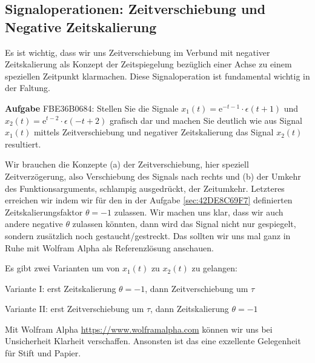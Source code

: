 \subsection{Signaloperationen: Zeitverschiebung und Negative Zeitskalierung}
\label{sec:FBE36B0684}
\begin{Ziel}
Es ist wichtig, dass wir uns Zeitverschiebung im Verbund mit negativer Zeitskalierung
als Konzept der Zeitspiegelung bezüglich einer Achse zu einem speziellen Zeitpunkt
klarmachen. Diese Signaloperation ist fundamental wichtig in der Faltung.
\end{Ziel}
\textbf{Aufgabe} {\tiny FBE36B0684}: Stellen Sie die Signale
$x_1(t) = \mathrm{e}^{-t-1} \cdot \epsilon(t+1)$ und
$x_2(t) = \mathrm{e}^{t-2} \cdot \epsilon(-t+2)$
grafisch dar und machen Sie deutlich wie aus Signal $x_1(t)$ mittels Zeitverschiebung
und negativer Zeitskalierung das Signal $x_2(t)$ resultiert.
\begin{Werkzeug}
Wir brauchen die Konzepte (a) der Zeitverschiebung, hier speziell Zeitverzögerung,
also Verschiebung des Signals nach rechts und (b) der Umkehr des Funktionsarguments,
schlampig ausgedrückt, der Zeitumkehr. Letzteres erreichen wir indem wir
für den in der Aufgabe \ref{sec:42DE8C69F7} definierten Zeitskalierungsfaktor
$\theta=-1$ zulassen. Wir machen uns klar, dass wir auch andere negative
$\theta$ zulassen könnten, dann wird das Signal nicht nur gespiegelt,
sondern zusätzlich noch gestaucht/gestreckt. Das sollten wir uns mal ganz in Ruhe
mit Wolfram Alpha als Referenzlösung anschauen.
\end{Werkzeug}
\begin{Ansatz}
Es gibt zwei Varianten um von $x_1(t)$ zu $x_2(t)$ zu gelangen:

Variante I: erst Zeitskalierung $\theta=-1$, dann Zeitverschiebung um $\tau$

Variante II: erst Zeitverschiebung um $\tau$, dann Zeitskalierung $\theta=-1$

\end{Ansatz}
\begin{ExCalc}
Mit Wolfram Alpha \url{https://www.wolframalpha.com} können wir uns bei
Unsicherheit Klarheit verschaffen.
%
Ansonsten ist das eine exzellente Gelegenheit für Stift und Papier.
\end{ExCalc}
